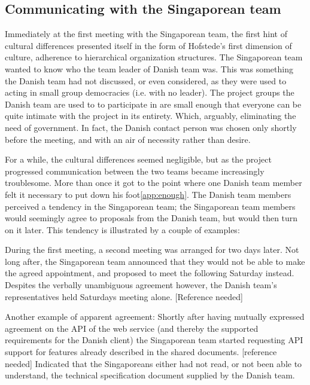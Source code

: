 \subsection{Communicating with the Singaporean team}
\label{sec:communicating}

Immediately at the first meeting with the Singaporean team, the first hint of
cultural differences presented itself in the form of Hofstede's first dimension
of culture, adherence to hierarchical organization structures\cite{surprises}.
The Singaporean team wanted to know who the team leader of Danish team was.
This was something the Danish team had not discussed, or even considered, as
they were used to acting in small group democracies (i.e. with no leader). The
project groups the Danish team are used to to participate in are small enough
that everyone can be quite intimate with the project in its entirety. Which,
arguably, eliminating the need of government. In fact, the Danish contact
person was chosen only shortly before the meeting, and with an air of necessity
rather than desire.

For a while, the cultural differences seemed negligible, but as the project
progressed communication between the two teams became increasingly troublesome.
More than once it got to the point where one Danish team member felt it necessary
to put down his foot\ref{app:enough}. The Danish team members perceived a tendency in the Singaporean
team; the Singaporean team members would seemingly agree to proposals from the Danish team, but
would then turn on it later. This tendency is illustrated by a couple of
examples:

During the first meeting, a second meeting was arranged for two days later. Not
long after, the Singaporean team announced that they would not be able to make the
agreed appointment, and proposed to meet the following Saturday instead.
Despites the verbally unambiguous agreement however, the Danish team's
representatives held Saturdays meeting alone. [Reference needed]

Another example of apparent agreement: Shortly after having mutually expressed
agreement on the API of the web service (and thereby the supported requirements
for the Danish client) the Singaporean team started requesting API support for features
already described in the shared documents. [reference needed] Indicated that
the Singaporeans either had not read, or not been able to understand, the technical
specification document supplied by the Danish team.

